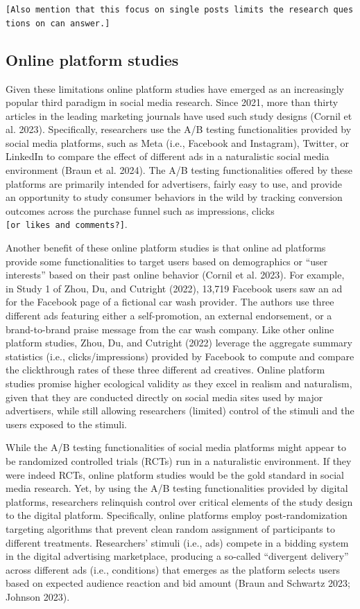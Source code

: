 \documentclass[
  a4paper,
]{scrreprt}
\begin{document}
\texttt{{[}Also\ mention\ that\ this\ focus\ on\ single\ posts\ limits\ the\ research\ questions\ on\ can\ answer.{]}}

\hypertarget{online-platform-studies}{%
\subsection{Online platform studies}\label{online-platform-studies}}

Given these limitations online platform studies have emerged as an
increasingly popular third paradigm in social media research. Since
2021, more than thirty articles in the leading marketing journals have
used such study designs (Cornil et al. 2023). Specifically, researchers
use the A/B testing functionalities provided by social media platforms,
such as Meta (i.e., Facebook and Instagram), Twitter, or LinkedIn to
compare the effect of different ads in a naturalistic social media
environment (Braun et al. 2024). The A/B testing functionalities offered
by these platforms are primarily intended for advertisers, fairly easy
to use, and provide an opportunity to study consumer behaviors in the
wild by tracking conversion outcomes across the purchase funnel such as
impressions, clicks \texttt{{[}or\ likes\ and\ comments?{]}}.

Another benefit of these online platform studies is that online ad
platforms provide some functionalities to target users based on
demographics or ``user interests'' based on their past online behavior
(Cornil et al. 2023). For example, in Study 1 of Zhou, Du, and Cutright
(2022), 13,719 Facebook users saw an ad for the Facebook page of a
fictional car wash provider. The authors use three different ads
featuring either a self-promotion, an external endorsement, or a
brand-to-brand praise message from the car wash company. Like other
online platform studies, Zhou, Du, and Cutright (2022) leverage the
aggregate summary statistics (i.e., clicks/impressions) provided by
Facebook to compute and compare the clickthrough rates of these three
different ad creatives. Online platform studies promise higher
ecological validity as they excel in realism and naturalism, given that
they are conducted directly on social media sites used by major
advertisers, while still allowing researchers (limited) control of the
stimuli and the users exposed to the stimuli.

While the A/B testing functionalities of social media platforms might
appear to be randomized controlled trials (RCTs) run in a naturalistic
environment. If they were indeed RCTs, online platform studies would be
the gold standard in social media research. Yet, by using the A/B
testing functionalities provided by digital platforms, researchers
relinquish control over critical elements of the study design to the
digital platform. Specifically, online platforms employ
post-randomization targeting algorithms that prevent clean random
assignment of participants to different treatments. Researchers' stimuli
(i.e., ads) compete in a bidding system in the digital advertising
marketplace, producing a so-called ``divergent delivery'' across
different ads (i.e., conditions) that emerges as the platform selects
users based on expected audience reaction and bid amount (Braun and
Schwartz 2023; Johnson 2023).
\end{document}
